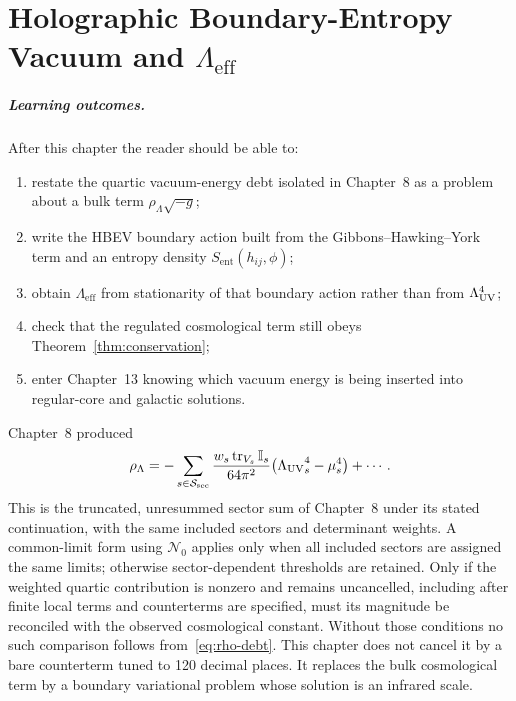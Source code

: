 \chapter[HBEV]{Holographic Boundary-Entropy Vacuum and \(\Lambda_{\mathrm{eff}}\)}
\label{ch:hbev}

\paragraph{Learning outcomes.}
After this chapter the reader should be able to:
\begin{enumerate}
  \item restate the quartic vacuum-energy debt isolated in
        Chapter~8 as a problem about a bulk term
        \(\rho_\Lambda\sqrt{-g}\);
  \item write the HBEV boundary action built from the
        Gibbons--Hawking--York term and an entropy density
        \(S_{\mathrm{ent}}(h_{ij},\phi)\);
  \item obtain \(\Lambda_{\mathrm{eff}}\) from stationarity of that
        boundary action rather than from \(\Lambda_{\mathrm{UV}}^4\);
  \item check that the regulated cosmological term still obeys
        Theorem~\ref{thm:conservation};
  \item enter Chapter~13 knowing which vacuum energy is being
        inserted into regular-core and galactic solutions.
\end{enumerate}

Chapter~8 produced
\begin{equation}
  \label{eq:rho-debt}
  \rho_\Lambda
  =-\sum_{s\in\mathcal{S}_{\mathrm{sec}}}
    \frac{w_s\operatorname{tr}_{V_s}\mathbb I_s}{64\pi^2}
    \bigl({\Lambda_{\mathrm{UV}}}_s^4-\mu_s^4\bigr)+\cdots.
\end{equation}
This is the truncated, unresummed sector sum of
Chapter~8 under its stated continuation, with the same included
sectors and determinant weights. A common-limit form using
\(\mathcal N_0\) applies only when all included sectors are assigned
the same limits; otherwise sector-dependent thresholds are retained.
Only if the weighted quartic contribution is nonzero and remains
uncancelled, including after finite local terms and counterterms are
specified, must its magnitude be reconciled with the observed
cosmological constant. Without those conditions no such comparison
follows from~\eqref{eq:rho-debt}. This chapter does not cancel it by a
bare counterterm tuned to 120 decimal places. It replaces the bulk
cosmological term by a boundary variational problem whose solution
is an infrared scale.

